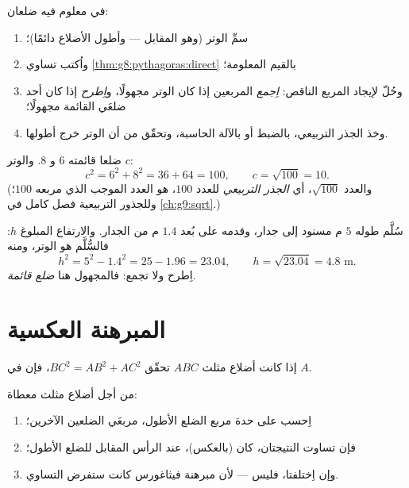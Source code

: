 \begin{method}\label{met:g8:pythagoras:compute}
في  معلوم فيه ضلعان:
\begin{enumerate}
  \item سمِّ الوتر (وهو المقابل  --- وأطول
        الأضلاع دائمًا)؛
  \item واُكتب تساوي \cref{thm:g8:pythagoras:direct} بالقيم
        المعلومة؛
  \item وحُلّ لإيجاد المربع الناقص: \emph{اِجمع} المربعين إذا كان
        الوتر مجهولًا، و\emph{اِطرح} إذا كان أحد ضلعَي القائمة مجهولًا؛
  \item وخذ الجذر التربيعي، بالضبط أو بالآلة الحاسبة، وتحقّق
        من أن الوتر خرج أطولها.
\end{enumerate}
\end{method}

\begin{example}\label{ex:g8:pythagoras:hypotenuse}
 ضلعا قائمته $6$ و $8$. والوتر $c$:
\[
c^2 = 6^2 + 8^2 = 36 + 64 = 100,
\qquad
c = \sqrt{100} = 10 .
\]
(والعدد $\sqrt{100}$، أي \emph{الجذر التربيعي} للعدد $100$، هو
العدد الموجب الذي مربعه $100$؛ وللجذور التربيعية فصل كامل
في \cref{ch:g9:sqrt}.)
\end{example}

\begin{example}\label{ex:g8:pythagoras:leg}
سُلَّم طوله $5$ م مسنود إلى جدار، وقدمه على بُعد $1.4$ م من الجدار.
والارتفاع المبلوغ $h$: فالسُّلَّم هو الوتر، ومنه
\[
h^2 = 5^2 - 1.4^2 = 25 - 1.96 = 23.04,
\qquad
h = \sqrt{23.04} = 4.8 \text{ m}.
\]
اِطرح ولا تجمع: فالمجهول هنا \emph{ضلع قائمة}.
\end{example}

\section{المبرهنة العكسية}

\begin{theorem}\label{thm:g8:pythagoras:converse}
إذا كانت أضلاع مثلث $ABC$ تحقّق $BC^2 = AB^2 + AC^2$، فإن
 في $A$.
\end{theorem}
\admitted

\begin{method}\label{met:g8:pythagoras:test}
من أجل أضلاع مثلث معطاة:
\begin{enumerate}
  \item اِحسب على حدة مربع الضلع الأطول، 
        مربعَي الضلعين الآخرين؛
  \item فإن تساوت النتيجتان، كان 
        (بالعكس)، عند الرأس المقابل للضلع الأطول؛
  \item وإن اِختلفتا، فليس  --- لأن مبرهنة
        فيثاغورس كانت ستفرض التساوي.
\end{enumerate}
\end{method}

